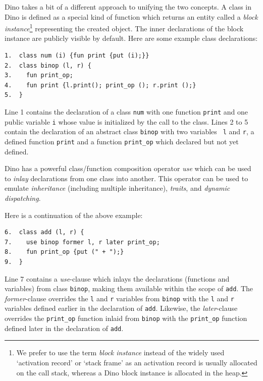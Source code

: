 \documentclass[preprint]{sigplanconf}
\begin{document}
Dino takes a bit of a different approach to unifying the two concepts.
  A class in Dino is defined as %
a special
kind of function which returns an entity called a \emph{block instance}\footnote{We prefer to use the
term \emph{block instance} instead of the widely used `activation record' or `stack frame' 
as an activation record is usually allocated on the call stack, whereas a Dino block 
instance is allocated in the heap.} representing the created
object. The inner declarations of the block instance are publicly visible by default.
Here are some example class declarations:

{\footnotesize
\begin{verbatim}
1.  class num (i) {fun print {put (i);}}
2.  class binop (l, r) {
3.    fun print_op;
4.    fun print {l.print(); print_op (); r.print ();}
5.  }
\end{verbatim}
}

Line 1 contains the declaration of a class {\tt num} with one function {\tt print} and one public variable {\tt i} whose value is initialized by the call to the class.  Lines 2 to 5
contain the declaration of an abstract class {\tt binop} with two variables {\tt
l} and {\tt r}, a defined function {\tt print} and a function {\tt print\_op} which declared but not yet defined.

Dino has a powerful class/function composition operator
\emph{use} which can be used to \emph{inlay} declarations from one class into another. 
This operator can be used to emulate \emph{inheritance} (including multiple inheritance), \emph{traits}, and
\emph{dynamic dispatching}. 

Here is a continuation of the above example:

{\footnotesize
\begin{verbatim}
6.  class add (l, r) {
7.    use binop former l, r later print_op;
8.    fun print_op {put (" + ");}
9.  }
\end{verbatim}
}

Line 7 contains a \emph{use}-clause which inlays the
declarations (functions and variables) from class {\tt binop}, making them available within the scope of {\tt add}. 
The \emph{former}-clause overrides the {\tt l} and {\tt r} variables from {\tt binop}
with the {\tt l} and {\tt r} variables defined earlier in the declaration of {\tt add}.
Likewise, the \emph{later}-clause overrides the {\tt print\_op} function inlaid from {\tt binop} with the {\tt print\_op} function defined later in the declaration of {\tt add}.
\end{document}
